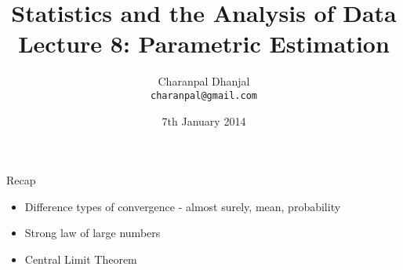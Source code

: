 \documentclass{beamer}
\title{Statistics and the Analysis of Data\\ Lecture 8: Parametric Estimation}
\author{Charanpal Dhanjal \\ \texttt{charanpal@gmail.com}}
\institute{\'{E}cole des Ponts}
\date{7th January 2014}
\begin{document}
\frame{\titlepage}

\begin{frame}{Recap}  
\begin{itemize} 
\item Difference types of convergence - almost surely, mean, probability 
\item Strong law of large numbers 
\item Central Limit Theorem 
\end{itemize}
\end{frame}
\end{document}
